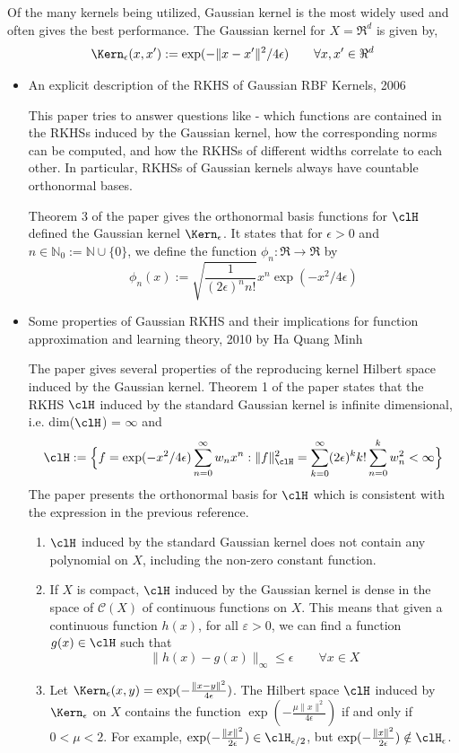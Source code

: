 Of the many kernels being utilized, Gaussian kernel is the most widely used and often gives the best performance. The Gaussian kernel for $X = \Re^d$ is given by,
\[
\Kern_{\epsilon}(x,x') := \exp(-\|x - x'\|^2/ 4\epsilon) \qquad \forall x,x' \in \Re^d
\]
\begin{itemize}
\item An explicit description of the RKHS of Gaussian RBF Kernels, 2006 

This paper tries to answer questions like - which functions are contained in the RKHSs induced by the Gaussian kernel, how the corresponding norms can be computed, and how the RKHSs of different widths correlate to each other. 
In particular, RKHSs of Gaussian kernels always have countable orthonormal bases. 

Theorem 3 of the paper gives the orthonormal basis functions for $\clH$ defined the Gaussian kernel $\Kern_\epsilon$. It states that for $\epsilon >0$ and $n \in \mathbb{N}_0 := \mathbb{N} \cup \{0\}$, we define the function $\phi_n : \Re \to \Re$ by
\[
\phi_n(x) := \sqrt{\frac{1}{(2\epsilon)^n n!}}x^n \exp(-x^2/4\epsilon)
\]
\item Some properties of Gaussian RKHS and their implications for function approximation and learning theory, 2010 by Ha Quang Minh

The paper gives several properties of the reproducing kernel Hilbert space induced by the Gaussian kernel.
Theorem 1 of the paper states that the RKHS $\clH$ induced by the standard Gaussian kernel is infinite dimensional, i.e. dim($\clH$) = $\infty$ and 
\[
\clH := \Bigl\{ f = \exp(-x^2/4\epsilon) \sum_{n=0}^\infty w_n x^n: \|f\|^2_\clH = \sum_{k=0}^\infty (2\epsilon)^k k! \sum_{n=0}^k w_n^2 <\infty \Bigr\}
\]
The paper presents the orthonormal basis for $\clH$ which is consistent with the expression in the previous reference. 

\begin{enumerate}
	\item $\clH$ induced by the standard Gaussian kernel does not contain any polynomial on $X$, including the non-zero constant function. 
	
	\item If $X$ is compact, $\clH$ induced by the Gaussian kernel is dense in the space of $\mathcal{C}(X)$ of continuous functions on $X$.
	This means that given a continuous function $h(x)$, for all $\varepsilon >0$, we can find a function $g(x) \in \clH$ such that 
	\[
	\|h(x) - g(x)\|_\infty \leq \epsilon \qquad \forall x \in X
	\] 
	\item Let $\Kern_{\epsilon}(x,y) = \exp(-\frac{\|x-y\|^2}{4\epsilon})$. The Hilbert space $\clH$ induced by $\Kern_\epsilon$ on $X$ contains the function $\exp(-\frac{\mu \|x\|^2} {4 \epsilon})$ if and only if $0<\mu <2$. For example, $\exp(-\frac{\|x\|^2}{2 \epsilon}) \in \clH_{\epsilon/2}$, but  $\exp(-\frac{\|x\|^2}{2 \epsilon}) \notin \clH_{\epsilon}$.
	

\end{enumerate}
\end{itemize}
